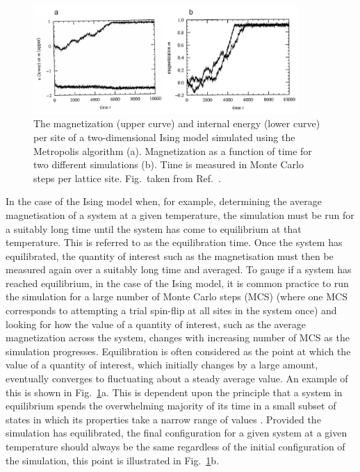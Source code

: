 \documentclass[11pt, twoside]{report}
\begin{document}
\begin{figure}[h!]
  \centering
    \includegraphics[width=0.9\textwidth]{figures/ising_equil.png}
    \caption[The magnetization (upper curve) and internal energy (lower curve) per site of a two-dimensional Ising model simulated using the Metropolis algorithm (a). Magnetization as a function of time for two different simulations (b). Time is measured in Monte Carlo steps per lattice site.]{The magnetization (upper curve) and internal energy (lower curve) per site of a two-dimensional Ising model simulated using the Metropolis algorithm (a). Magnetization as a function of time for two different simulations (b). Time is measured in Monte Carlo steps per lattice site. Fig.~taken from Ref.~.}
  \label{ising_equil}
\end{figure}

In the case of the Ising model when, for example, determining the average magnetisation of a system at a given temperature, the simulation must be run for a suitably long time until the system has come to equilibrium at that temperature. This is referred to as the equilibration time. Once the system has equilibrated, the quantity of interest such as the magnetisation must then be measured again over a suitably long time and averaged. 
To gauge if a system has reached equilibrium, in the case of the Ising model, it is common practice to run the simulation for a large number of Monte Carlo steps (MCS) (where one MCS corresponds to attempting a trial spin-flip at all sites in the system once) and looking for how the value of a quantity of interest, such as the average magnetization across the system, changes with increasing number of MCS as the simulation progresses. Equilibration is often considered as the point at which the value of a quantity of interest, which initially changes by a large amount, eventually converges to fluctuating about a steady average value. An example of this is shown in Fig.~\ref{ising_equil}a. This is dependent upon the principle that a system in equilibrium spends the overwhelming majority of its time in a small subset of states in which its properties take a narrow range of values \cite{MC}. Provided the simulation has equilibrated, the final configuration for a given system at a given temperature should always be the same regardless of the initial configuration of the simulation, this point is illustrated in Fig.~\ref{ising_equil}b.
\end{document}
